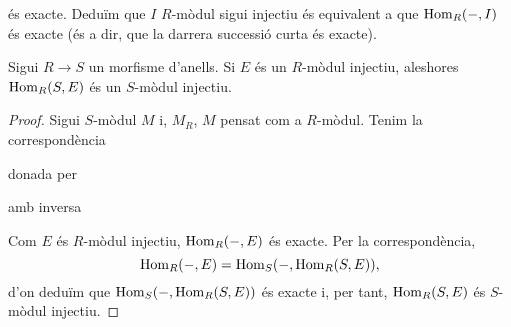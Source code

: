 és exacte. Deduïm que $I$ $R$-mòdul sigui injectiu és equivalent a que $\operatorname{Hom}_{R}(-,I)$ és exacte (és a dir, que la darrera successió curta és exacte).
\begin{lema}
    Sigui $R\rightarrow S$ un morfisme d'anells. Si $E$ és un $R$-mòdul injectiu, aleshores $\operatorname{Hom}_{R}(S,E)$ és un $S$-mòdul injectiu.
    \begin{proof}
        Sigui $S$-mòdul $M$ i, $M_{R}$, $M$ pensat com a $R$-mòdul. Tenim la correspondència
        \begin{center}
        \end{center}
        donada per
        \begin{center}
        \end{center}
        amb inversa
        \begin{center}
        \end{center}
        Com $E$ és $R$-mòdul injectiu, $\operatorname{Hom}_{R}(-,E)$ és exacte. Per la correspondència,
        \begin{equation*}
            \operatorname{Hom}_{R}(-,E)=\operatorname{Hom}_{S}(-,\operatorname{Hom}_{R}(S,E)),
        \end{equation*}
        d'on deduïm que $\operatorname{Hom}_{S}(-,\operatorname{Hom}_{R}(S,E))$ és exacte i, per tant, $\operatorname{Hom}_{R}(S,E)$ és $S$-mòdul injectiu.
    \end{proof}
\end{lema}
